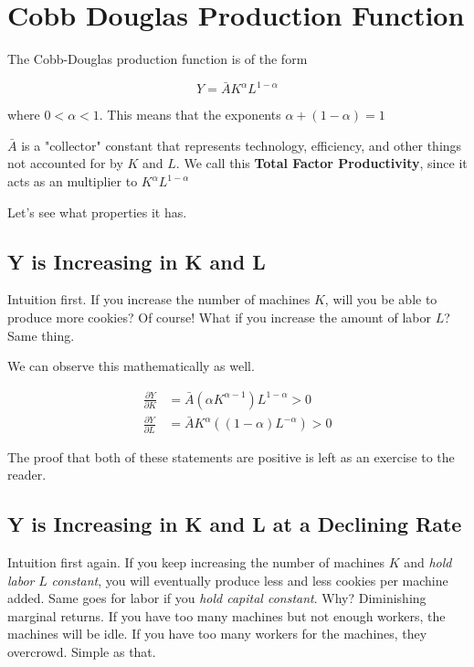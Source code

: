 \documentclass[11pt]{scrartcl}
\begin{document}
\section{Cobb Douglas Production Function}

The Cobb-Douglas production function is of the form

\[Y = \bar{A} K^\alpha L^{1-\alpha} \]

where $0 < \alpha < 1$. This means that the exponents $\alpha + (1-\alpha) = 1$

$\bar{A}$ is a "collector" constant that represents technology, efficiency, and other things not accounted for by $K$ and $L$. We call this \textbf{Total Factor Productivity}, since it acts as an multiplier to $K^\alpha L^{1-\alpha}$

Let's see what properties it has.

\subsection{Y is Increasing in K and L}

Intuition first. If you increase the number of machines $K$, will you be able to produce more cookies? Of course! What if you increase the amount of labor $L$? Same thing.

We can observe this mathematically as well.

\begin{align*}
\frac{\partial Y}{\partial K} &= \bar{A} (\alpha K^{\alpha - 1}) L^{1-\alpha} > 0 \\ 
\frac{\partial Y}{\partial L} &= \bar{A} K^\alpha ((1-\alpha)L^{-\alpha}) > 0
\end{align*}

The proof that both of these statements are positive is left as an exercise to the reader.

\subsection{Y is Increasing in K and L at a Declining Rate}

Intuition first again. If you keep increasing the number of machines $K$ and \emph{hold labor} $L$ \emph{constant}, you will eventually produce less and less cookies per machine added. Same goes for labor if you \emph{hold capital constant}. Why? Diminishing marginal returns. If you have too many machines but not enough workers, the machines will be idle. If you have too many workers for the machines, they overcrowd. Simple as that.
\end{document}
